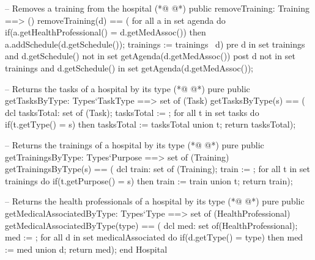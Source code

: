 \begin{vdmpp}[breaklines=true]
 -- Removes a training from the hospital
(*@
\label{removeTraining:117}
@*)
 public removeTraining: Training ==> ()
  removeTraining(d) == (
   for all a in set agenda do
    if(a.getHealthProfessional() = d.getMedAssoc())
      then a.addSchedule(d.getSchedule());
   trainings := trainings \ {d})
 pre d in set trainings and d.getSchedule() not in set getAgenda(d.getMedAssoc())
 post d not in set trainings and d.getSchedule() in set getAgenda(d.getMedAssoc());
 
 -- Returns the tasks of a hospital by its type
(*@
\label{getTasksByType:127}
@*)
 pure public getTasksByType: Types`TaskType ==> set of (Task)
  getTasksByType(s) == (
   dcl tasksTotal: set of (Task);
   tasksTotal := {};
   for all t in set tasks do
    if(t.getType() = s)
     then tasksTotal := tasksTotal union {t};  
   return tasksTotal);
 
 -- Returns the trainings of a hospital by its type
(*@
\label{getTrainingsByType:137}
@*)
 pure public getTrainingsByType: Types`Purpose ==> set of (Training)
  getTrainingsByType(s) == (
   dcl train: set of (Training);
   train := {};
   for all t in set trainings do
    if(t.getPurpose() = s)
     then train := train union {t}; 
   return train);

 -- Returns the health professionals of a hospital by its type
(*@
\label{getMedicalAssociatedByType:147}
@*)
 pure public getMedicalAssociatedByType: Types`Type ==> set of (HealthProfessional)
  getMedicalAssociatedByType(type) == (
   dcl med: set of(HealthProfessional);
   med := {};
   for all d in set medicalAssociated do
    if(d.getType() = type)
     then med := med union {d};
   return med);
end Hospital
\end{vdmpp}
\bigskip
